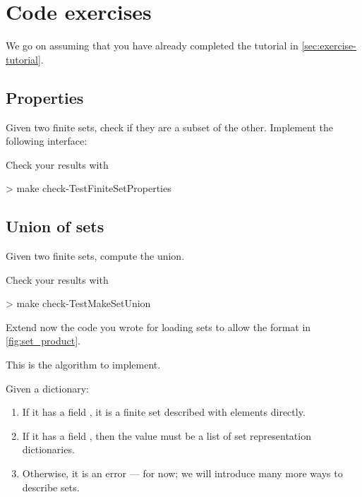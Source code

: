 

\section{Code exercises}

We go on assuming that you have already completed the tutorial in \cref{sec:exercise-tutorial}.

\subsection{Properties}

\begin{gradedexercise}
  Given two finite sets, check if they are a subset of the other.
  Implement the following interface:
\end{gradedexercise}

Check your results with
\begin{console}
  > make check-TestFiniteSetProperties
\end{console}

\subsection{Union of sets}


\begin{gradedexercise}
  Given two finite sets, compute the union.
\end{gradedexercise}

Check your results with
\begin{console}
  > make check-TestMakeSetUnion
\end{console}


Extend now the code you wrote for loading sets to allow the format in \cref{fig:set_product}.

This is the algorithm to implement.

Given a dictionary:
\begin{enumerate}
\item If it has a field , it is a finite set described with elements directly.
\item If it has a field , then the value must be a list of set representation dictionaries.
\item Otherwise, it is an error --- for now; we will introduce many more ways to describe sets.
\end{enumerate}

